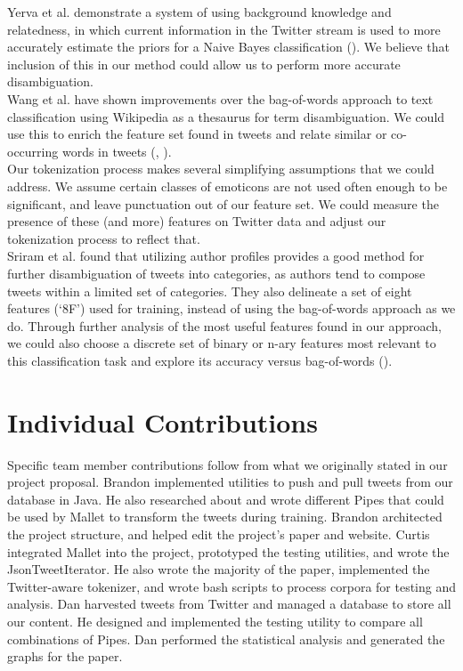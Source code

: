 \documentclass[letterpaper]{article}
\begin{document}
Yerva et al. demonstrate a system of using background knowledge and relatedness, in which current information in the Twitter stream is used to more accurately estimate the priors for a Naive Bayes classification (\citeauthor{journals/ijcsa/YervaMA12}). We believe that inclusion of this in our method could allow us to perform more accurate disambiguation.\\

Wang et al. have shown improvements over the bag-of-words approach to text classification using Wikipedia as a thesaurus for term disambiguation. We could use this to enrich the feature set found in tweets and relate similar or co-occurring words in tweets (\citeauthor{Wang:2008:UWC:1510528.1511383}, \citeauthor{Wang:2009:UWK:1554488.1554492}).\\

Our tokenization process makes several simplifying assumptions that we could address. We assume certain classes of emoticons are not used often enough to be significant, and leave punctuation out of our feature set. We could measure the presence of these (and more) features on Twitter data and adjust our tokenization process to reflect that.\\

Sriram et al. found that utilizing author profiles provides a good method for further disambiguation of tweets into categories, as authors tend to compose tweets within a limited set of categories. They also delineate a set of eight features (`8F') used for training, instead of using the bag-of-words approach as we do. Through further analysis of the most useful features found in our approach, we could also choose a discrete set of binary or n-ary features most relevant to this classification task and explore its accuracy versus bag-of-words (\citeauthor{Sriram:2010:STC:1835449.1835643}).

\section{Individual Contributions}
Specific team member contributions follow from what we originally stated in our project proposal. Brandon implemented utilities to push and pull tweets from our database in Java. He also researched about and wrote different Pipes that could be used by Mallet to transform the tweets during training. Brandon architected the project structure, and helped edit the project's paper and website. Curtis integrated Mallet into the project, prototyped the testing utilities, and wrote the JsonTweetIterator. He also wrote the majority of the paper, implemented the Twitter-aware tokenizer, and wrote bash scripts to process corpora for testing and analysis. Dan harvested tweets from Twitter and managed a database to store all our content. He designed and implemented the testing utility to compare all combinations of Pipes. Dan performed the statistical analysis and generated the graphs for the paper.\\
\end{document}

